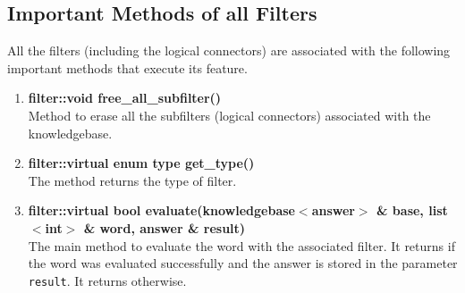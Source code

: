 \subsection{Important Methods of all Filters}

All the filters (including the logical connectors) are associated with the following important methods that execute its feature.

\begin{enumerate}
 
\item \textbf{filter::void free\_all\_subfilter()} \\
	Method to erase all the subfilters (logical connectors) associated with the knowledgebase.
 \item \textbf{filter::virtual enum type get\_type()} \\
	The method returns the type of filter. 
 \item \textbf{filter::virtual bool evaluate(knowledgebase$<$answer$>$ \& base, list$<$int$>$ \& word, answer \& result)} \\
	The main method to evaluate the word with the associated filter. It returns \true if the word was evaluated successfully and the answer is stored in the parameter \texttt{result}. It returns \false otherwise.
\end{enumerate}


